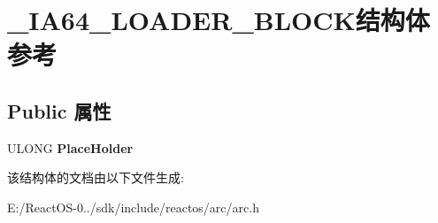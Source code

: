 \hypertarget{struct___i_a64___l_o_a_d_e_r___b_l_o_c_k}{}\section{\+\_\+\+I\+A64\+\_\+\+L\+O\+A\+D\+E\+R\+\_\+\+B\+L\+O\+C\+K结构体 参考}
\label{struct___i_a64___l_o_a_d_e_r___b_l_o_c_k}
\subsection*{Public 属性}
\begin{DoxyCompactItemize}
\item 
\mbox{\label{struct___i_a64___l_o_a_d_e_r___b_l_o_c_k_a7cc2667a487c53bea61ea89fd665e5d5}} 
U\+L\+O\+NG {\bfseries Place\+Holder}
\end{DoxyCompactItemize}


该结构体的文档由以下文件生成\+:\begin{DoxyCompactItemize}
\item 
E\+:/\+React\+O\+S-\/0../sdk/include/reactos/arc/arc.\+h\end{DoxyCompactItemize}
